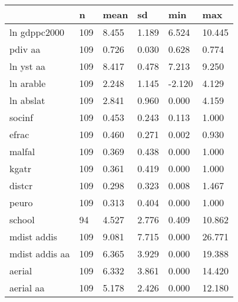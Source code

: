 \begin{table}[htbp]
\begin{tabular}{|l|l|l|l|l|l|}\hline  
 & n  & mean  & sd  & min  & max  \\ \hline  
ln gdppc2000 &       109 &     8.455 &     1.189 &     6.524 &    10.445 \\ \hline 
pdiv aa &       109 &     0.726 &     0.030 &     0.628 &     0.774 \\ \hline 
ln yst aa &       109 &     8.417 &     0.478 &     7.213 &     9.250 \\ \hline 
ln arable &       109 &     2.248 &     1.145 &    -2.120 &     4.129 \\ \hline 
ln abslat &       109 &     2.841 &     0.960 &     0.000 &     4.159 \\ \hline 
socinf &       109 &     0.453 &     0.243 &     0.113 &     1.000 \\ \hline 
efrac &       109 &     0.460 &     0.271 &     0.002 &     0.930 \\ \hline 
malfal &       109 &     0.369 &     0.438 &     0.000 &     1.000 \\ \hline 
kgatr &       109 &     0.361 &     0.419 &     0.000 &     1.000 \\ \hline 
distcr &       109 &     0.298 &     0.323 &     0.008 &     1.467 \\ \hline 
peuro &       109 &     0.313 &     0.404 &     0.000 &     1.000 \\ \hline 
school &        94 &     4.527 &     2.776 &     0.409 &    10.862 \\ \hline 
mdist addis &       109 &     9.081 &     7.715 &     0.000 &    26.771 \\ \hline 
mdist addis aa &       109 &     6.365 &     3.929 &     0.000 &    19.388 \\ \hline 
aerial &       109 &     6.332 &     3.861 &     0.000 &    14.420 \\ \hline 
aerial aa &       109 &     5.178 &     2.426 &     0.000 &    12.180 \\ \hline 
  \end{tabular}
\end{table}
